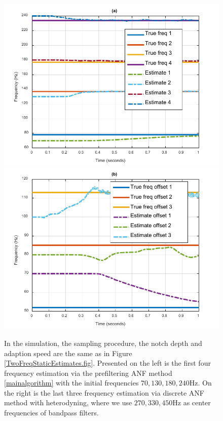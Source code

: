 \documentclass{UCF_ETD}
\begin{document}
\begin{figure}[H]
\begin{center}
\includegraphics[scale=0.75]{NonuniformANF/EstimateFirst4of7}
\includegraphics[scale=0.75]{NonuniformANF/EstimateLast3of7}
\caption{In the simulation, the sampling  procedure, the notch  depth  and adaption speed
  are the same as in Figure \ref{TwoFreqStaticEstimates.fig}.
  Presented on the left is the first four frequency estimation via the prefiltering ANF method \eqref{mainalgorithm} with
   the  initial frequencies $70, 130, 180, 240$Hz. On the right
  is the last three frequency estimation via  discrete ANF method
with heterodyning, where we use $270, 330, 450$Hz as center frequencies of
bandpass filters. }
\label{SevenFreqEstimates.fig}
\end{center}
\end{figure}
\end{document}

